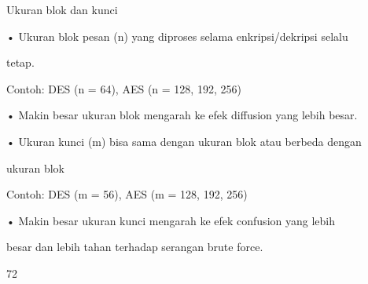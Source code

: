 \documentclass{article}
\begin{document}

Ukuran blok dan kunci

• Ukuran blok pesan (n) yang diproses selama enkripsi/dekripsi selalu 

tetap.

   Contoh: DES (n = 64), AES (n = 128, 192, 256)

• Makin besar ukuran blok mengarah ke efek diffusion yang lebih besar.

• Ukuran kunci (m) bisa sama dengan ukuran blok atau berbeda dengan 

ukuran blok

   Contoh: DES (m = 56), AES (m = 128, 192, 256)

• Makin besar ukuran kunci mengarah ke efek confusion yang lebih 

besar dan lebih tahan terhadap serangan brute force.

72
\end{document}
